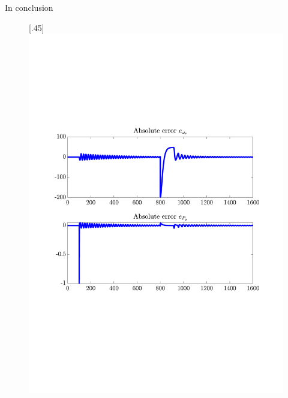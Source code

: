 In conclusion 

\begin{figure}[H]
    \centering

    [.45\textwidth]{\includegraphics[width=1\linewidth, scale=1, trim=60 230 55 150,clip]{fig/Open_loop/exp_1_error.pdf}}
%

\end{figure}
